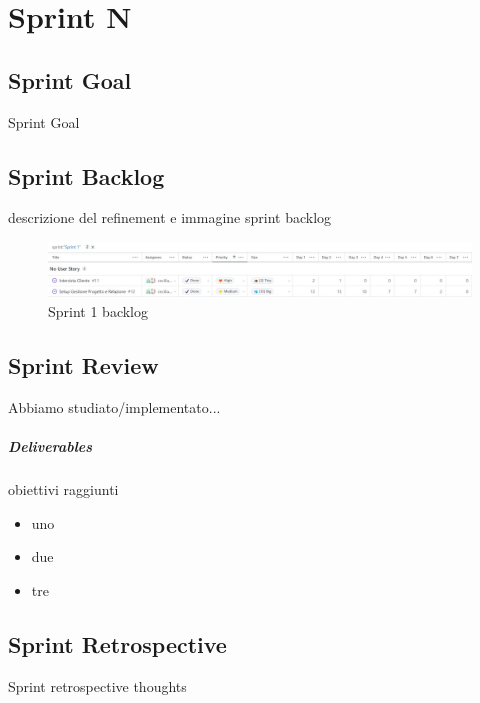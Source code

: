 \chapter{Sprint N}

\section{Sprint Goal}
Sprint Goal


\section{Sprint Backlog}
descrizione del refinement e immagine sprint backlog
\begin{figure}[H]
    \centering
    \includegraphics[width=\textwidth]{process/Img/Sprint1BL.jpg}
    \caption{Sprint 1 backlog}
    \label{fig:Sprint1}
\end{figure}


\section{Sprint Review}
Abbiamo studiato/implementato...
\paragraph{Deliverables} 
obiettivi raggiunti
\begin{itemize}
    \item uno
    \item due
    \item tre
\end{itemize}


\section{Sprint Retrospective}
Sprint retrospective thoughts 